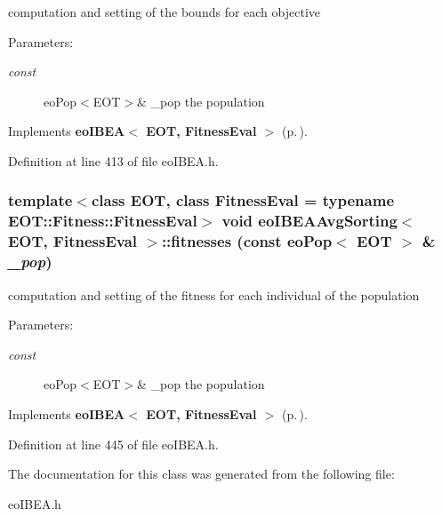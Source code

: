 computation and setting of the bounds for each objective 

\begin{Desc}
\item[Parameters:]
\begin{description}
\item[{\em const}]eo\-Pop$<$EOT$>$\& \_\-pop the population \end{description}
\end{Desc}


Implements {\bf eo\-IBEA$<$ EOT, Fitness\-Eval $>$} {\rm (p.\,\pageref{classeoIBEA})}.

Definition at line 413 of file eo\-IBEA.h.
\subsubsection{\setlength{\rightskip}{0pt plus 5cm}template$<$class EOT, class Fitness\-Eval = typename EOT::Fitness::Fitness\-Eval$>$ void {\bf eo\-IBEAAvg\-Sorting}$<$ EOT, Fitness\-Eval $>$::fitnesses (const {\bf eo\-Pop}$<$ EOT $>$ \& {\em \_\-pop})\hspace{0.3cm}{\tt  [inline, private, virtual]}}\label{classeoIBEAAvgSorting_4bc8c46d151d7935d7b2ac8bfbdd7ee6}


computation and setting of the fitness for each individual of the population 

\begin{Desc}
\item[Parameters:]
\begin{description}
\item[{\em const}]eo\-Pop$<$EOT$>$\& \_\-pop the population \end{description}
\end{Desc}


Implements {\bf eo\-IBEA$<$ EOT, Fitness\-Eval $>$} {\rm (p.\,\pageref{classeoIBEA})}.

Definition at line 445 of file eo\-IBEA.h.

The documentation for this class was generated from the following file:\begin{CompactItemize}
\item 
eo\-IBEA.h\end{CompactItemize}
